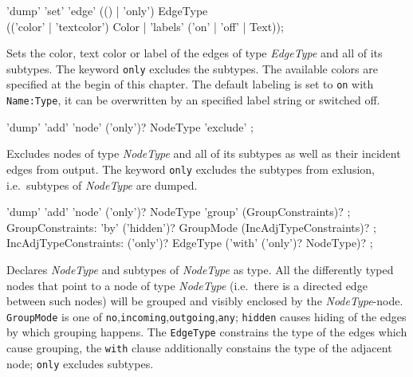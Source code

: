 \begin{rail}
  'dump' 'set' 'edge' (() | 'only') EdgeType \\ (('color' | 'textcolor') Color | 'labels' ('on' | 'off' | Text));
\end{rail}
Sets the color, text color or label of the edges of type \emph{EdgeType} and all of its subtypes.
The keyword \texttt{only} excludes the subtypes. The available colors are specified at the begin of this chapter.
The default labeling is set to \texttt{on} with \texttt{Name:Type}, it can be overwritten by an specified label string or switched off.

\begin{rail}
  'dump' 'add' 'node' ('only')? NodeType 'exclude' ;
\end{rail}
Excludes nodes of type \emph{NodeType} and all of its subtypes as well as their incident edges from output.
The keyword \texttt{only} excludes the subtypes from exlusion, i.e.\ subtypes of \emph{NodeType} are dumped.

\begin{rail}
  'dump' 'add' 'node' ('only')? NodeType 'group' (GroupConstraints)? ;
GroupConstraints:
  'by' ('hidden')? GroupMode (IncAdjTypeConstraints)? ;
IncAdjTypeConstraints:
  ('only')? EdgeType ('with' ('only')? NodeType)? ;
\end{rail}
Declares \emph{NodeType} and subtypes of \emph{NodeType} as  type.
All the differently typed nodes that point to a node of type \emph{NodeType} 
(i.e.\ there is a directed edge between such nodes) will be grouped and visibly enclosed by the \emph{NodeType}-node.
\texttt{GroupMode} is one of \texttt{no},\texttt{incoming},\texttt{outgoing},\texttt{any}; \texttt{hidden} causes hiding of the edges by which grouping happens.
The \texttt{EdgeType} constrains the type of the edges which cause grouping, the \texttt{with} clause additionally constains the type of the adjacent node; 
\texttt{only} excludes subtypes.

